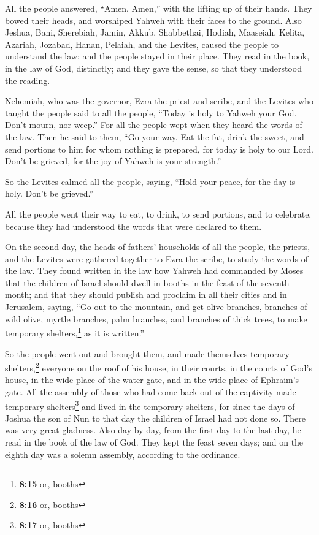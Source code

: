 All the people answered, ``Amen, Amen,'' with the lifting up of their
hands. They bowed their heads, and worshiped Yahweh with their faces to
the ground.  Also Jeshua, Bani, Sherebiah, Jamin, Akkub,
Shabbethai, Hodiah, Maaseiah, Kelita, Azariah, Jozabad, Hanan, Pelaiah,
and the Levites, caused the people to understand the law; and the people
stayed in their place.  They read in the book, in the law
of God, distinctly; and they gave the sense, so that they understood the
reading.

 Nehemiah, who was the governor, Ezra the priest and
scribe, and the Levites who taught the people said to all the people,
``Today is holy to Yahweh your God. Don't mourn, nor weep.'' For all the
people wept when they heard the words of the law.  Then
he said to them, ``Go your way. Eat the fat, drink the sweet, and send
portions to him for whom nothing is prepared, for today is holy to our
Lord. Don't be grieved, for the joy of Yahweh is your strength.''

 So the Levites calmed all the people, saying, ``Hold
your peace, for the day is holy. Don't be grieved.''

 All the people went their way to eat, to drink, to send
portions, and to celebrate, because they had understood the words that
were declared to them.

 On the second day, the heads of fathers' households of
all the people, the priests, and the Levites were gathered together to
Ezra the scribe, to study the words of the law.  They
found written in the law how Yahweh had commanded by Moses that the
children of Israel should dwell in booths in the feast of the seventh
month;  and that they should publish and proclaim in all
their cities and in Jerusalem, saying, ``Go out to the mountain, and get
olive branches, branches of wild olive, myrtle branches, palm branches,
and branches of thick trees, to make temporary shelters,\footnote{\textbf{8:15}
  or, booths} as it is written.''

 So the people went out and brought them, and made
themselves temporary shelters,\footnote{\textbf{8:16} or, booths}
everyone on the roof of his house, in their courts, in the courts of
God's house, in the wide place of the water gate, and in the wide place
of Ephraim's gate.  All the assembly of those who had
come back out of the captivity made temporary shelters\footnote{\textbf{8:17}
  or, booths} and lived in the temporary shelters, for since the days of
Joshua the son of Nun to that day the children of Israel had not done
so. There was very great gladness.  Also day by day, from
the first day to the last day, he read in the book of the law of God.
They kept the feast seven days; and on the eighth day was a solemn
assembly, according to the ordinance.

